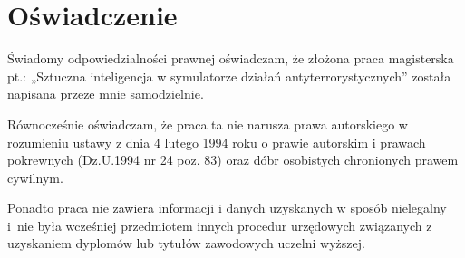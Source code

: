 \chapter*{Oświadczenie}
Świadomy odpowiedzialności prawnej oświadczam, że złożona praca magisterska pt.: „Sztuczna inteligencja w symulatorze działań antyterrorystycznych” została napisana przeze mnie samodzielnie.

Równocześnie oświadczam, że praca ta nie narusza prawa autorskiego w rozumieniu ustawy z dnia 4 lutego 1994 roku o prawie autorskim i prawach pokrewnych (Dz.U.1994 nr 24 poz. 83) oraz dóbr osobistych chronionych prawem cywilnym.

Ponadto praca nie zawiera informacji i danych uzyskanych w sposób nielegalny i~nie była wcześniej przedmiotem innych procedur urzędowych związanych z uzyskaniem dyplomów lub tytułów zawodowych uczelni wyższej.

